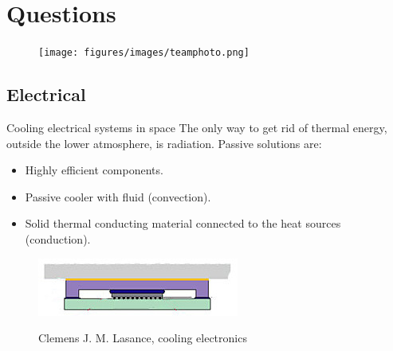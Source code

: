 \documentclass[11pt, aspectratio=169]{beamer}
\begin{document}
\section{Questions}
\begin{frame}
    \label{slide:questions}
    \centering
    \vspace{-0.71cm}
    \begin{figure}
    \hspace*{-1.1cm}
    	\texttt{[image: figures/images/teamphoto.png]}
    \end{figure}
\end{frame}






\subsection{Electrical}
\begin{frame}[t]{Cooling electrical systems in space}
    The only way to get rid of thermal energy, outside the lower atmosphere, is radiation. Passive solutions are:
    \begin{itemize}
        \item Highly efficient components.
        \item Passive cooler with fluid (convection).
        \item Solid thermal conducting material connected to the heat sources (conduction).
    \end{itemize}
    
        \centering
        \vspace{1cm}
        \begin{figure}
            \includegraphics[width=.5\textwidth]{figures/images/Passive_cooler_2.jpg}\\
            \caption{Clemens J. M. Lasance, cooling electronics}
        \end{figure}
\end{frame}
\end{document}
